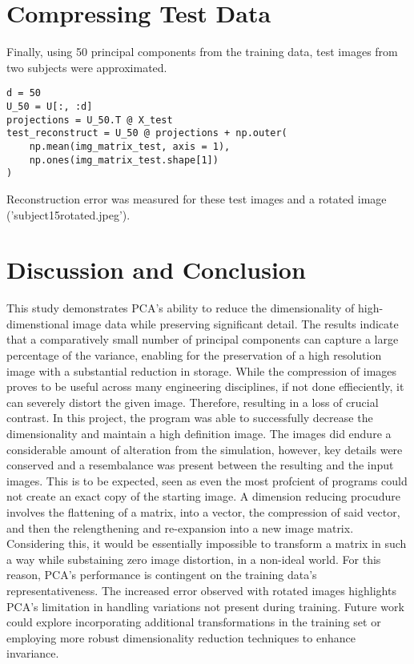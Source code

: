 \documentclass[conference]{IEEEtran}
\begin{document}
\section{Compressing Test Data}
Finally, using 50 principal components from the training data, test images from two subjects were approximated.
\begin{verbatim}
d = 50
U_50 = U[:, :d]
projections = U_50.T @ X_test
test_reconstruct = U_50 @ projections + np.outer(
    np.mean(img_matrix_test, axis = 1),
    np.ones(img_matrix_test.shape[1])
)
\end{verbatim}

Reconstruction error was measured for these test images and a rotated image ('subject15rotated.jpeg').





\section{Discussion and Conclusion}
This study demonstrates PCA's ability to reduce the dimensionality of high-dimenstional image data while preserving significant detail. The results indicate that a comparatively small number of principal components can capture a large percentage of the variance, enabling for the preservation of a high resolution image with a substantial reduction in storage. While the compression of images proves to be useful across many engineering disciplines, if not done effieciently, it can severely distort the given image. Therefore, resulting in a loss of crucial contrast. In this project, the program was able to successfully decrease the dimensionality and maintain a high definition image. The images did endure a considerable amount of alteration from the simulation, however, key details were conserved and a resembalance was present between the resulting and the input images. This is to be expected, seen as even the most profcient of programs could not create an exact copy of the starting image. A dimension reducing procudure involves the flattening of a matrix, into a vector, the compression of said vector, and then the relengthening and re-expansion into a new image matrix. Considering this, it would be essentially impossible to transform a matrix in such a way while substaining zero image distortion, in a non-ideal world. For this reason, PCA's performance is contingent on the training data's representativeness. The increased error observed with rotated images highlights PCA's limitation in handling variations not present during training. Future work could explore incorporating additional transformations in the training set or employing more robust dimensionality reduction techniques to enhance invariance.
\end{document}
